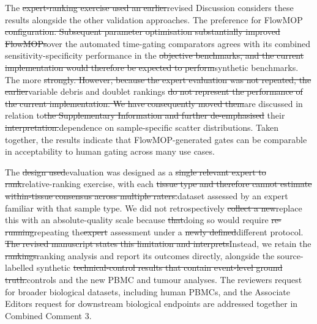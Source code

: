 \documentclass[
  11pt,
  a4paper,
]{article}
\begin{document}
The {\color{revisionred}\sout{expert-ranking exercise used an
earlier}}{\color{revisionblue}revised Discussion considers these results
alongside the other validation approaches. The preference for} FlowMOP
{\color{revisionred}\sout{configuration. Subsequent parameter
optimisation substantially improved
FlowMOP\textquotesingle s}}{\color{revisionblue}over the automated
time-gating comparators agrees with its combined
sensitivity-specificity} performance in the
{\color{revisionred}\sout{objective benchmarks, and the current
implementation would therefore be expected to
perform}}{\color{revisionblue}synthetic benchmarks. The} more
{\color{revisionred}\sout{strongly. However, because the expert
evaluation was not repeated, the earlier}}{\color{revisionblue}variable
debris and doublet} rankings {\color{revisionred}\sout{do not represent
the performance of the current implementation. We have consequently
moved them}}{\color{revisionblue}are discussed in relation}
to{\color{revisionred}\sout{the Supplementary Information and further
de-emphasised}} their
{\color{revisionred}\sout{interpretation.}}{\color{revisionblue}dependence
on sample-specific scatter distributions. Taken together, the results
indicate that FlowMOP-generated gates can be comparable in acceptability
to human gating across many use cases.}

The {\color{revisionred}\sout{design
used}}{\color{revisionblue}evaluation was designed as} a
{\color{revisionred}\sout{single relevant expert to
rank}}{\color{revisionblue}relative-ranking exercise, with} each
{\color{revisionred}\sout{tissue type and therefore cannot estimate
within-tissue consensus across multiple
raters.}}{\color{revisionblue}dataset assessed by an expert familiar
with that sample type.} We did not retrospectively
{\color{revisionred}\sout{collect a new}}{\color{revisionblue}replace
this with an} absolute-quality scale because
{\color{revisionred}\sout{that}}{\color{revisionblue}doing so} would
require
{\color{revisionred}\sout{re-running}}{\color{revisionblue}repeating}
the{\color{revisionred}\sout{expert}} assessment under a
{\color{revisionred}\sout{newly defined}}{\color{revisionblue}different}
protocol. {\color{revisionred}\sout{The revised manuscript states this
limitation and interprets}}{\color{revisionblue}Instead, we retain} the
{\color{revisionred}\sout{rankings}}{\color{revisionblue}ranking
analysis and report its outcomes directly,} alongside the
{\color{revisionblue}source-labelled} synthetic
{\color{revisionred}\sout{technical-control results that contain
event-level ground truth.}}{\color{revisionblue}controls and the new
PBMC and tumour analyses.} The reviewer\textquotesingle s request for
broader biological datasets, including human PBMCs, and the Associate
Editor\textquotesingle s request for downstream biological endpoints are
addressed together in Combined Comment 3.
\end{document}
